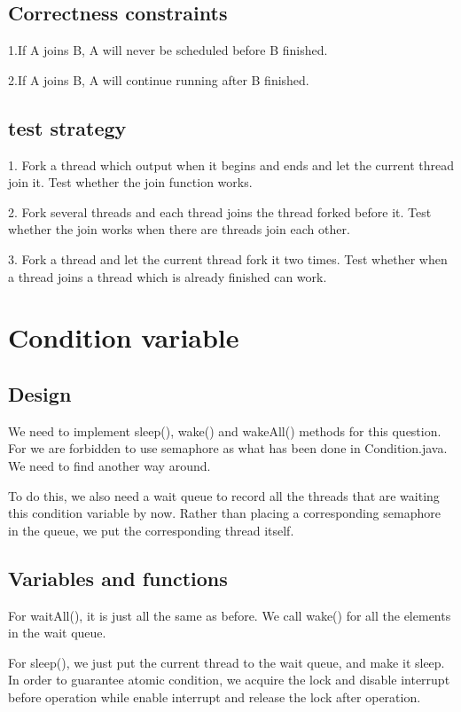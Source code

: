 \documentclass[a4paper,10pt]{article}
\begin{document}
\subsection{Correctness constraints}

1.If A joins B, A will never be scheduled before B finished.

2.If A joins B, A will continue running after B finished.

\subsection{test strategy}

1. Fork a thread which output when it begins and ends and let the current thread join it. Test whether the join function works.

2. Fork several threads and each thread joins the thread forked before it. Test whether the join works when there are threads join each other.

3. Fork a thread and let the current thread fork it two times. Test whether when a thread joins a thread which is already finished can work.

\section{Condition variable}

\subsection {Design}

We need to implement sleep(), wake() and wakeAll() methods for this question. For we are forbidden to use semaphore as what has been done in Condition.java. We need to find another way around.

To do this, we also need a wait queue to record all the threads that are waiting this condition variable by now. Rather than placing a corresponding semaphore in the queue, we put the corresponding thread itself.

\subsection{Variables and functions}
For waitAll(), it is just all the same as before. We call wake() for all the elements in the wait queue.

For sleep(), we just put the current thread to the wait queue, and make it sleep. In order to guarantee atomic condition, we acquire the lock and disable interrupt before operation while enable interrupt and release the lock after operation.
\end{document}

